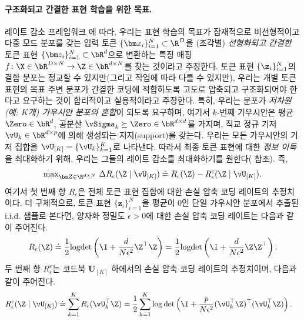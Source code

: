 \documentclass[../../book-main_ko.tex]{subfiles}
\begin{document}
\paragraph{구조화되고 간결한 표현 학습을 위한 목표.}
레이트 감소 프레임워크 에 따라, 우리는 표현 학습의 목표가 잠재적으로 비선형적이고 다중 모드 분포를 갖는 입력 토큰 \(\{\bm x_i\}_{i=1}^N \subset \R^D\)을 (조각별) \textit{선형화되고 간결한} 토큰 표현 \(\{\bm z_i\}_{i=1}^N \subset \bR^{d}\)으로 변환하는 특징 매핑 \(f \colon \X \in \bR^{D \times N} \to \Z\in \bR^{d \times N}\)를 찾는 것이라고 주장한다. 토큰 표현 \(\{\z_{i}\}_{i = 1}^{N}\)의 결합 분포는 정교할 수 있지만(그리고 작업에 따라 다를 수 있지만), 우리는 개별 토큰 표현의 목표 주변 분포가 간결한 코딩에 적합하도록 고도로 압축되고 구조화되어야 한다고 요구하는 것이 합리적이고 실용적이라고 주장한다. 특히, 우리는 분포가 \textit{저차원(예: \(K\)개) 가우시안 분포의 혼합}이 되도록 요구하며, 여기서 \(k\)-번째 가우시안은 평균 \(\Zero \in \bR^{d}\), 공분산 \(\vSigma_{k} \succeq \Zero \in \bR^{d \times d}\)를 가지며, 직교 정규 기저 \(\vU_{k} \in \bR^{d \times p}\)에 의해 생성되는 지지(support)를 갖는다.
우리는 모든 가우시안의 기저 집합을 $\vU_{[K]} = \{\vU_k\}_{k=1}^K$로 나타낸다. 따라서 최종 토큰 표현에 대한 \textit{정보 이득} \cite{ma2022principles}을 최대화하기 위해, 우리는 그들의 레이트 감소를 최대화하기를 원한다( 참조). 즉,
\begin{align}\label{eq:rate reduction}
    \mathrm{max}_{\bm Z \in \R^{d\times N}}\ \Delta R_{\epsilon}(\Z \mid \vU_{[K]}) \doteq R_{\epsilon}(\Z) - R^c_{\epsilon}(\Z \mid \vU_{[K]}).
\end{align}
여기서 첫 번째 항 $R_{\epsilon}$은 전체 토큰 표현 집합에 대한 손실 압축 코딩 레이트의 추정치이다. 더 구체적으로, 토큰 표현 $\{\bm z_i\}_{i=1}^N$을 평균이 0인 단일 가우시안 분포에서 추출된 i.i.d. 샘플로 본다면, 양자화 정밀도 $\epsilon > 0$에 대한 손실 압축 코딩 레이트는 다음과 같이 주어진다.
\begin{equation}\label{eq:coding_rate}
    R_{\epsilon}(\Z) \doteq \frac{1}{2}\textrm{logdet}\left(\I + \frac{d}{N\epsilon^{2}}\Z^{\top}\Z\right) = \frac{1}{2}\textrm{logdet}\left(\I + \frac{d}{N\epsilon^{2}}\Z\Z^{\top}\right).
\end{equation}
두 번째 항 $R_{\epsilon}^c$는 코드북 $\bm U_{[K]}$ 하에서의 손실 압축 코딩 레이트의 추정치이며, 다음과 같이 주어진다.
\begin{equation}
\begin{aligned}
    R_{\epsilon}^c(\Z \mid \vU_{[K]}) &\doteq \sum_{k=1}^{K}R_{\epsilon}(\vU_k^{\top} \Z) = \frac{1}{2}\sum_{k=1}^{K}\log\det\left(\I +
    \frac{p}{N\epsilon^{2}}(\vU_k^{\top}\Z)^{\top}(\vU_k^{\top}\Z)\right).
\end{aligned}
\label{eq:def-mcr-Rc}
\end{equation}
\end{document}
